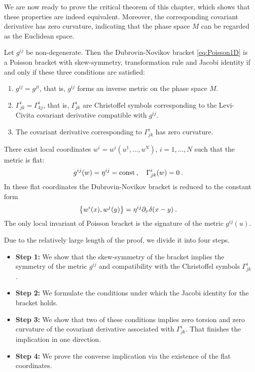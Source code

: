We are now ready to prove the critical theorem of this chapter, which shows that these properties are indeed equivalent. Moreover, the corresponding covariant derivative has zero curvature, indicating that the phase space $M$ can be regarded as the Euclidean space.

\begin{theorem} \label{Theorem-Dubrovin-Novikov-1D}
    Let $g^{ij}$ be non-degenerate. Then the Dubrovin-Novikov bracket \eqref{eq:Poisson1D} is a Poisson bracket with skew-symmetry, transformation rule and Jacobi identity if and only if these three conditions are satisfied:
    \begin{enumerate}
        \item $g^{ij} = g^{ji}$, that is, $g^{ij}$ forms an inverse metric on the phase space $M$.
        \item $\Gamma^{i}_{jk} = \Gamma^i_{kj}$, that is, $\Gamma^{i}_{jk}$ are Christoffel symbols corresponding to the Levi-Civita covariant derivative compatible with $g^{ij}$.
        \item The covariant derivative corresponding to $\Gamma^{i}_{jk}$ has zero curvature.
    \end{enumerate}
\end{theorem}

\begin{corollary} \label{Corollary: existence of flat coordinates}
    There exist local coordinates $w^i = w^i(u^1, \dots, u^N)$, $i = 1, \dots, N$ such that the metric is flat:
    \begin{align}
        g^{ij}(w) = \eta^{ij} = \mathrm{const} \:, \quad \Gamma^i_{jk} (w) = 0 \:.
    \end{align}
    In these flat coordinates the Dubrovin-Novikov bracket is reduced to the constant form
    \begin{align}
        \left \lbrace w^i(x),w^j(y) \right \rbrace = \eta^{ij} \partial_x \delta(x-y) \:.
    \end{align}
    The only local invariant of Poisson bracket is the signature of the metric $g^{ij}(u)$.
\end{corollary}

Due to the relatively large length of the proof, we divide it into four steps.
\begin{itemize}
    \item \textbf{Step 1:} We show that the skew-symmetry of the bracket implies the symmetry of the metric $g^{ij}$ and compatibility with the Christoffel symbols $\Gamma^i_{jk}$.
    \item \textbf{Step 2:} We formulate the conditions under which the Jacobi identity for the bracket holds.
    \item \textbf{Step 3:} We show that two of these conditions implies zero torsion and zero curvature of the covariant derivative associated with $\Gamma^i_{jk}$. That finishes the implication in one direction.
    \item \textbf{Step 4:} We prove the converse implication via the existence of the flat coordinates.
\end{itemize}

